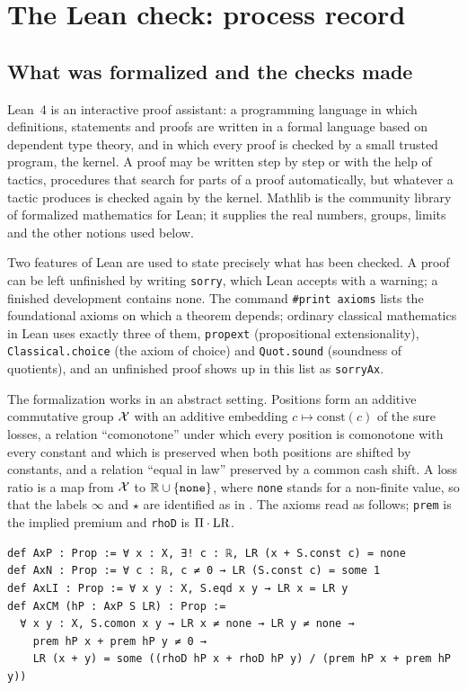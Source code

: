 \section{The Lean check: process record}\label{supp:lean}

\subsection{What was formalized and the checks made}\label{supp:lean-detail}

Lean~4 \citep{demoura2021} is an interactive proof assistant: a programming language in which definitions,
statements and proofs are written in a formal language based on dependent type theory, and in which every proof is
checked by a small trusted program, the kernel. A proof may be written step by step or with the help of tactics,
procedures that search for parts of a proof automatically, but whatever a tactic produces is checked again by the
kernel. Mathlib \citep{mathlib2020} is the community library of formalized mathematics for Lean; it supplies the
real numbers, groups, limits and the other notions used below.

Two features of Lean are used to state precisely what has been checked. A proof can be left unfinished by writing
\texttt{sorry}, which Lean accepts with a warning; a finished development contains none. The command
\texttt{\#print axioms} lists the foundational axioms on which a theorem depends; ordinary classical mathematics in
Lean uses exactly three of them, \texttt{propext} (propositional extensionality), \texttt{Classical.choice} (the
axiom of choice) and \texttt{Quot.sound} (soundness of quotients), and an unfinished proof shows up in this list as
\texttt{sorryAx}.

The formalization works in an abstract setting. Positions form an additive commutative group $\mathcal X$ with an additive
embedding $c\mapsto\mathrm{const}(c)$ of the sure losses, a relation ``comonotone'' under which every position is
comonotone with every constant and which is preserved when both positions are shifted by constants, and a relation
``equal in law'' preserved by a common cash shift. A loss ratio is a map from $\mathcal X$ to $\mathbb R\cup\{\mathtt{none}\}$,
where \texttt{none} stands for a non-finite value, so that the labels $\infty$ and $\star$ are identified as in
\axLI. The axioms read as follows; \texttt{prem} is the implied premium and \texttt{rhoD} is $\Pi\cdot\mathrm{LR}$.

{\small
\begin{verbatim}
def AxP : Prop := ∀ x : X, ∃! c : ℝ, LR (x + S.const c) = none
def AxN : Prop := ∀ c : ℝ, c ≠ 0 → LR (S.const c) = some 1
def AxLI : Prop := ∀ x y : X, S.eqd x y → LR x = LR y
def AxCM (hP : AxP S LR) : Prop :=
  ∀ x y : X, S.comon x y → LR x ≠ none → LR y ≠ none →
    prem hP x + prem hP y ≠ 0 →
    LR (x + y) = some ((rhoD hP x + rhoD hP y) / (prem hP x + prem hP y))
\end{verbatim}
}

